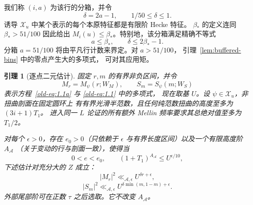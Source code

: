 \documentclass[11pt,a4paper]{article}
\numberwithin{equation}{section}
\numberwithin{figure}{section}
\newtheorem{lemma}[theorem]{引理}
\theoremstyle{definition}
\theoremstyle{remark}
\begin{document}
我们称 \((i,a)\) 为该行的分箱，并令
\[
 \delta=2a-1,\qquad 1/50\le\delta\le1.
\]
诱导 \(\mathcal X_u\) 中某个表示的每个本原特征都是有限阶 Hecke 特征。
\(\beta_*\) 的定义连同 \(\beta_*>51/100\) 因此给出
\(M_i(u)\le\beta_*\)。特别地，该分箱满足精确不等式
\[
 a\le\beta_*,\qquad \delta\le2\beta_*-1.
\]
分箱 \(a=51/100\) 将由平凡行计数来界定。对 \(a>51/100\)，
引理~\ref{lem:buffered-bins} 中的零点产生大的多项式，
可对其应用矩。

\begin{lemma}[逐点二元估计]\label{lem:detector-dyads}
固定 \(r,m\) 的有界非负区间，并令
\[
 M_r=M_\psi(r;W_M),\qquad S_m=S_\psi(m;W_S)
\]
表示方程~\eqref{old-eq:1.1a} 与 \eqref{old-eq:1.1} 中的多项式，
现在取基 \(U\)。设 \(\psi\in\mathcal X_u\)，非扭曲剖面在固定圆环上
有有界光滑半范数，且任何纯范数扭曲的高度至多为 \((3i+1)T_1\)。
进入同一 \(L\) 论证的所有额外 Mellin 频率要求其总绝对值至多为
\(T_1/2\)。

对每个 \(\epsilon>0\)，存在 \(e_0>0\)（只依赖于 \(\epsilon\)
与有界长度区间）以及一个有限高度阶 \(A_{\mathcal A}\)
（关于变动的行与剖面一致），使得当
\[
 0<e<e_0,\qquad (1+T_1)^{A_{\mathcal A}}\le U^{\epsilon/10},
\]
下述估计对充分大的 \(Z\) 成立：
\begin{equation}
 |M_r|^2\ll_{\mathcal A,\epsilon}U^{\delta r+\epsilon},
 \label{old-eq:6.2}
\end{equation}
\begin{equation}
 |S_m|^2\ll_{\mathcal A,\epsilon}
       U^{\delta\min(m,1-m)+\epsilon}.
 \label{old-eq:6.3}
\end{equation}
外部尾部阶可在正数 \(\tau\) 之后选取。它不改变 \(A_{\mathcal A}\)。
\end{lemma}
\end{document}
